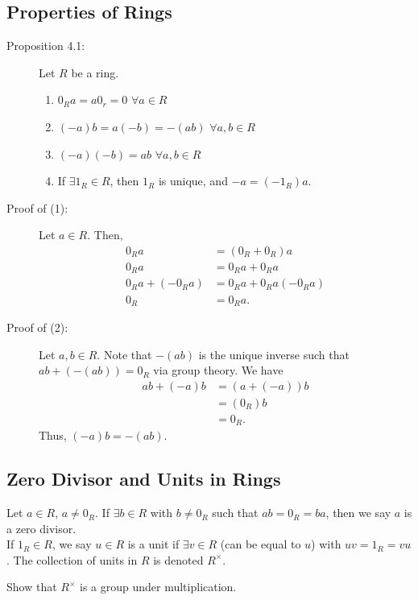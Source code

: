 \documentclass[8pt]{extarticle}
\begin{document}
  \subsection{Properties of Rings}%
  \begin{description}
    \item[Proposition 4.1:] Let $R$ be a ring.
      \begin{enumerate}[(1)]
        \item $0_R a = a0_r = 0$ $\forall a\in R$
        \item $(-a)b = a(-b) = -(ab)$ $\forall a,b\in R$
        \item $(-a)(-b) = ab$ $\forall a,b\in R$
        \item If $\exists 1_R\in R$, then $1_R$ is unique, and $-a = (-1_R)a$.
      \end{enumerate}
    \item[Proof of (1):] Let $a\in R$. Then,
      \begin{align*}
        0_Ra &= (0_R + 0_R)a \tag*{Additive Inverse}\\
        0_Ra &= 0_Ra + 0_Ra \tag*{Distributivity}\\
        0_Ra + (-0_Ra) &= 0_Ra + 0_Ra (-0_Ra)\\
        0_R &= 0_Ra. \tag*{Additive Inverse}
      \end{align*}
    \item[Proof of (2):] Let $a,b\in R$. Note that $-(ab)$ is the unique inverse such that $ab + (-(ab)) = 0_R$ via group theory. We have
      \begin{align*}
        ab + (-a)b &= (a+(-a))b \tag*{Distributivity}\\
                   &= (0_R)b\tag*{Additive Inverse}\\
                   &= 0_R. \tag*{By Property (1)}
      \end{align*}
      Thus, $(-a)b = -(ab)$.
  \end{description}
  \subsection{Zero Divisor and Units in Rings}%
    Let $a\in R$, $a\neq 0_R$. If $\exists b\in R$ with $b\neq 0_R$ such that $ab = 0_R = ba$, then we say $a$ is a zero divisor.\\

    If $1_R \in R$, we say $u\in R$ is a unit if $\exists v\in R$ (can be equal to $u$) with $uv = 1_R = vu$. The collection of units in $R$ is denoted $R^{\times}$.
    \begin{description}
      \tiny
      \item[Exercise:] Show that $R^{\times}$ is a group under multiplication.
    \end{description}
\end{document}
